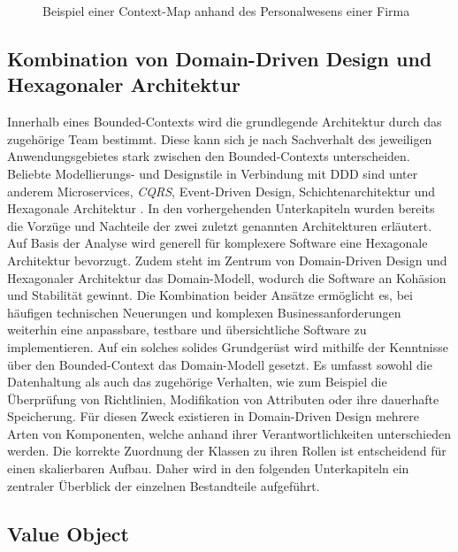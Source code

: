 \begin{figure}[H]
	\vspace{0.2cm}
	\centering
	\footnotesize
	
	\caption{Beispiel einer Context-Map anhand des Personalwesens einer Firma}
	\label{fig:Context-Map-Example}
\end{figure}

\subsection{Kombination von Domain-Driven Design und Hexagonaler Architektur}

Innerhalb eines Bounded-Contexts wird die grundlegende Architektur durch das zugehörige Team bestimmt. Diese kann sich je nach Sachverhalt des jeweiligen Anwendungsgebietes stark zwischen den Bounded-Contexts unterscheiden. Beliebte Modellierungs- und Designstile in Verbindung mit DDD sind unter anderem Microservices, \emph{\acrfull{CQRS}}, Event-Driven Design, Schichtenarchitektur und Hexagonale Architektur \cite[S. 113ff.]{Vernon.2015}. In den vorhergehenden Unterkapiteln wurden bereits die Vorzüge und Nachteile der zwei zuletzt genannten Architekturen erläutert. Auf Basis der Analyse wird generell für komplexere Software eine Hexagonale Architektur bevorzugt. Zudem steht im Zentrum von Domain-Driven Design und Hexagonaler Architektur das Domain-Modell, wodurch die Software an Kohäsion und Stabilität gewinnt. Die Kombination beider Ansätze ermöglicht es, bei häufigen technischen Neuerungen und komplexen Businessanforderungen weiterhin eine anpassbare, testbare und übersichtliche Software zu implementieren. Auf ein solches solides Grundgerüst wird mithilfe der Kenntnisse über den Bounded-Context das Domain-Modell gesetzt. Es umfasst sowohl die Datenhaltung als auch das zugehörige Verhalten, wie zum Beispiel die Überprüfung von Richtlinien, Modifikation von Attributen oder ihre dauerhafte Speicherung. Für diesen Zweck existieren in Domain-Driven Design mehrere Arten von Komponenten, welche anhand ihrer Verantwortlichkeiten unterschieden werden. Die korrekte Zuordnung der Klassen zu ihren Rollen ist entscheidend für einen skalierbaren Aufbau. Daher wird in den folgenden Unterkapiteln ein zentraler Überblick der einzelnen Bestandteile aufgeführt.

\subsection{Value Object}

